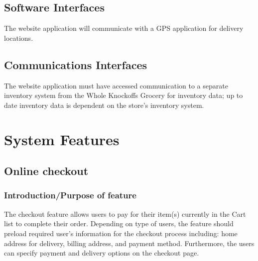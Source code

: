 \documentclass{scrreprt}
\theoremstyle{funreq}
\begin{document}
\subsection{Software Interfaces}
The website application will communicate with a GPS application for delivery locations.

\subsection{Communications Interfaces}
The website application must have accessed communication to a separate inventory system from the Whole Knockoffs Grocery for inventory data; up to date inventory data is dependent on the store's inventory system. 

\section{System Features}



\subsection{Online checkout}

	
	
	
	
	
	\subsubsection{Introduction/Purpose of feature}
	The checkout feature allows users to pay for their item(s) currently in the Cart list to complete their order. Depending on type of users, the feature should preload required user’s information for the checkout process including: home address for delivery, billing address, and payment method. Furthermore, the users can specify payment and delivery options on the checkout page. 
	
\end{document}
